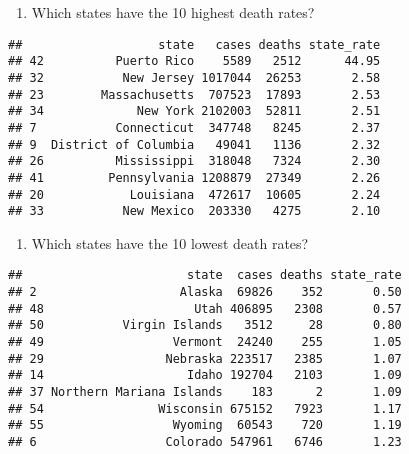\documentclass[
]{article}
\newenvironment{Shaded}{\begin{snugshade}}{\end{snugshade}}
\newcommand{\DecValTok}[1]{\textcolor[rgb]{0.00,0.00,0.81}{#1}}
\newcommand{\FunctionTok}[1]{\textcolor[rgb]{0.00,0.00,0.00}{#1}}
\newcommand{\NormalTok}[1]{#1}
\newcommand{\SpecialCharTok}[1]{\textcolor[rgb]{0.00,0.00,0.00}{#1}}
\providecommand{\tightlist}{%
  \setlength{\itemsep}{0pt}\setlength{\parskip}{0pt}}
\begin{document}
\begin{enumerate}
\def\labelenumi{\alph{enumi}.}
\setcounter{enumi}{4}
\tightlist
\item
  Which states have the 10 highest death rates?
\end{enumerate}

\begin{Shaded}
\end{Shaded}

\begin{verbatim}
##                   state   cases deaths state_rate
## 42          Puerto Rico    5589   2512      44.95
## 32           New Jersey 1017044  26253       2.58
## 23        Massachusetts  707523  17893       2.53
## 34             New York 2102003  52811       2.51
## 7           Connecticut  347748   8245       2.37
## 9  District of Columbia   49041   1136       2.32
## 26          Mississippi  318048   7324       2.30
## 41         Pennsylvania 1208879  27349       2.26
## 20            Louisiana  472617  10605       2.24
## 33           New Mexico  203330   4275       2.10
\end{verbatim}

\begin{enumerate}
\def\labelenumi{\alph{enumi}.}
\setcounter{enumi}{5}
\tightlist
\item
  Which states have the 10 lowest death rates?
\end{enumerate}

\begin{Shaded}
\end{Shaded}

\begin{verbatim}
##                       state  cases deaths state_rate
## 2                    Alaska  69826    352       0.50
## 48                     Utah 406895   2308       0.57
## 50           Virgin Islands   3512     28       0.80
## 49                  Vermont  24240    255       1.05
## 29                 Nebraska 223517   2385       1.07
## 14                    Idaho 192704   2103       1.09
## 37 Northern Mariana Islands    183      2       1.09
## 54                Wisconsin 675152   7923       1.17
## 55                  Wyoming  60543    720       1.19
## 6                  Colorado 547961   6746       1.23
\end{verbatim}
\end{document}
